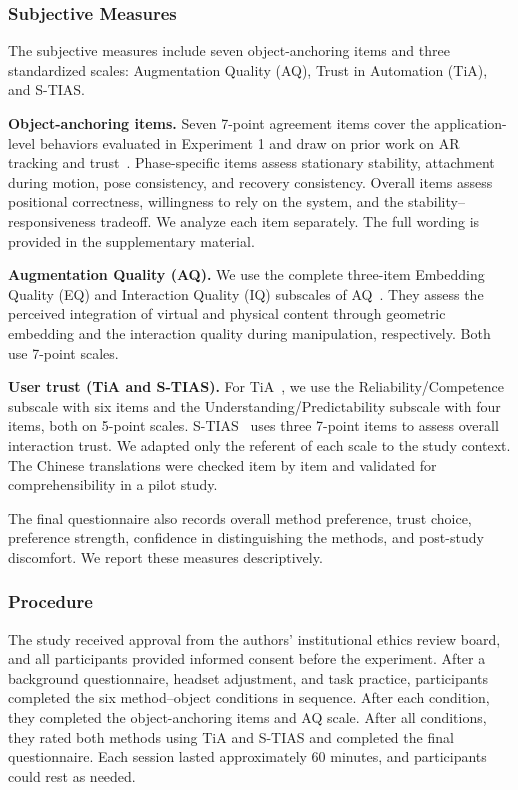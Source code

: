 \documentclass[review]{vgtc}
\begin{document}
\subsubsection{Subjective Measures}

The subjective measures include seven object-anchoring items and three standardized scales: Augmentation Quality (AQ), Trust in Automation (TiA), and S-TIAS.

\textbf{Object-anchoring items.}
Seven 7-point agreement items cover the application-level behaviors evaluated in Experiment 1 and draw on prior work on AR tracking and trust~\cite{trustar2024}. Phase-specific items assess stationary stability, attachment during motion, pose consistency, and recovery consistency. Overall items assess positional correctness, willingness to rely on the system, and the stability--responsiveness tradeoff. We analyze each item separately. The full wording is provided in the supplementary material.

\textbf{Augmentation Quality (AQ).}
We use the complete three-item Embedding Quality (EQ) and Interaction Quality (IQ) subscales of AQ~\cite{aq2026}. They assess the perceived integration of virtual and physical content through geometric embedding and the interaction quality during manipulation, respectively. Both use 7-point scales.

\textbf{User trust (TiA and S-TIAS).}
For TiA~\cite{tia2019}, we use the Reliability/Competence subscale with six items and the Understanding/Predictability subscale with four items, both on 5-point scales. S-TIAS~\cite{stias2025} uses three 7-point items to assess overall interaction trust. We adapted only the referent of each scale to the study context. The Chinese translations were checked item by item and validated for comprehensibility in a pilot study.

The final questionnaire also records overall method preference, trust choice, preference strength, confidence in distinguishing the methods, and post-study discomfort. We report these measures descriptively.

\subsubsection{Procedure}

The study received approval from the authors' institutional ethics review board, and all participants provided informed consent before the experiment. After a background questionnaire, headset adjustment, and task practice, participants completed the six method--object conditions in sequence. After each condition, they completed the object-anchoring items and AQ scale. After all conditions, they rated both methods using TiA and S-TIAS and completed the final questionnaire. Each session lasted approximately 60 minutes, and participants could rest as needed.
\end{document}
